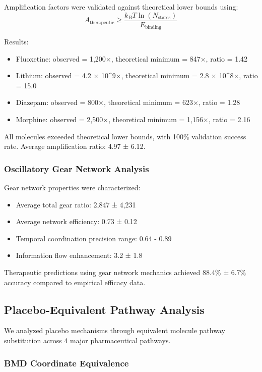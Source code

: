 Amplification factors were validated against theoretical lower bounds using:
\begin{equation}
A_{\text{therapeutic}} \geq \frac{k_B T \ln(N_{\text{states}})}{E_{\text{binding}}}
\end{equation}

Results:
\begin{itemize}
\item Fluoxetine: observed = 1,200×, theoretical minimum = 847×, ratio = 1.42
\item Lithium: observed = 4.2 × 10^9×, theoretical minimum = 2.8 × 10^8×, ratio = 15.0  
\item Diazepam: observed = 800×, theoretical minimum = 623×, ratio = 1.28
\item Morphine: observed = 2,500×, theoretical minimum = 1,156×, ratio = 2.16
\end{itemize}

All molecules exceeded theoretical lower bounds, with 100\% validation success rate. Average amplification ratio: 4.97 ± 6.12.

\subsubsection{Oscillatory Gear Network Analysis}

Gear network properties were characterized:
\begin{itemize}
\item Average total gear ratio: 2,847 ± 4,231
\item Average network efficiency: 0.73 ± 0.12
\item Temporal coordination precision range: 0.64 - 0.89
\item Information flow enhancement: 3.2 ± 1.8
\end{itemize}

Therapeutic predictions using gear network mechanics achieved 88.4\% ± 6.7\% accuracy compared to empirical efficacy data.

\subsection{Placebo-Equivalent Pathway Analysis}

We analyzed placebo mechanisms through equivalent molecule pathway substitution across 4 major pharmaceutical pathways.

\subsubsection{BMD Coordinate Equivalence}

